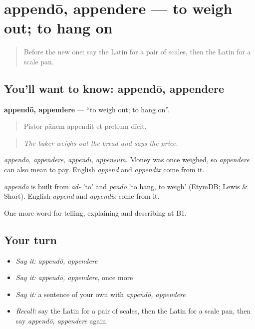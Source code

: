 \section[appendō, appendere]{appendō, appendere — to weigh out; to hang on}

\label{lesson:LA-C464-appendo}



\begin{quote}
Before the new one: say the Latin for a pair of scales, then the Latin for a scale pan.
\end{quote}

\subsection*{You'll want to know: appendō, appendere}
\textbf{appendō, appendere} — \textquotedblleft{}to weigh out; to hang on\textquotedblright{}.

\begin{quote}
Pistor pānem appendit et pretium dīcit.
\end{quote}

\begin{quote}
\emph{The baker weighs out the bread and says the price.}
\end{quote}

\emph{appendō, appendere, appendī, appēnsum}. Money was once weighed, so \emph{appendere} can also mean to pay. English \emph{append} and \emph{appendix} come from it.

\begin{cousinweb}
\emph{appendō} is built from \emph{ad-} 'to' and \emph{pendō} 'to hang, to weigh' (EtymDB; Lewis \& Short). English \emph{append} and \emph{appendix} come from it.
\end{cousinweb}

\begin{grammarlens}[title={What you've built}]
One more word for telling, explaining and describing at B1.
\end{grammarlens}

\subsection*{Your turn}
\begin{itemize}
\raggedright
  \item \emph{Say it:} \emph{appendō, appendere}
  \item \emph{Say it:} \emph{appendō, appendere}, once more
  \item \emph{Say it:} a sentence of your own with \emph{appendō, appendere}
  \item \emph{Recall:} say the Latin for a pair of scales, then the Latin for a scale pan, then say \emph{appendō, appendere} again
\end{itemize}

